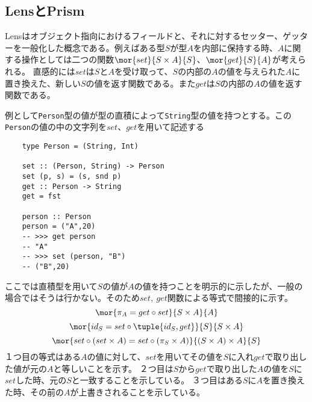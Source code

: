 \documentclass[uplatex,dvipdfmx]{jsarticle}
\newcommand{\pr}[1]{\colorbox[rgb]{0.9,0.9,0.9}{\lstinline{#1}}}
\begin{document}
  \subsection{LensとPrism}
  Lensはオブジェクト指向におけるフィールドと、それに対するセッター、ゲッターを一般化した概念である。例えばある型$S$が型$A$を内部に保持する時、$A$に関する操作としては二つの関数$\mor{set}{S\times A}{S}$、$\mor{get}{S}{A}$が考えられる。
  直感的には$set$は$S$と$A$を受け取って、$S$の内部の$A$の値を与えられた$A$に置き換えた、新しい$S$の値を返す関数である。また$get$は$S$の内部の$A$の値を返す関数である。
  
  例として\pr{Person}型の値が型の直積によって\pr{String}型の値を持つとする。この\pr{Person}の値の中の文字列を$set$、$get$を用いて記述する
  \begin{lstlisting}
    type Person = (String, Int)

    set :: (Person, String) -> Person
    set (p, s) = (s, snd p)
    get :: Person -> String
    get = fst

    person :: Person
    person = ("A",20)
    -- >>> get person
    -- "A"
    -- >>> set (person, "B")
    -- ("B",20)
  \end{lstlisting}
  ここでは直積型を用いて$S$の値が$A$の値を持つことを明示的に示したが、一般の場合ではそうは行かない。そのため$set,\ get$関数による等式で間接的に示す。
  \[\mor{\pi_A = get\circ set}{S\times A}{A}\]
  \[\mor{id_S = set\circ\tuple{id_S,get}}{S}{S\times A}\]
  \[\mor{set\circ(set\times A) = set\circ (\pi_S\times A)}{(S\times A)\times A}{S}\]
  １つ目の等式はある$A$の値に対して、$set$を用いてその値を$S$に入れ$get$で取り出した値が元の$A$と等しいことを示す。
  ２つ目は$S$から$get$で取り出した$A$の値を$S$に$set$した時、元の$S$と一致することを示している。
  ３つ目はある$S$に$A$を置き換えた時、その前の$A$が上書きされることを示している。
\end{document}
